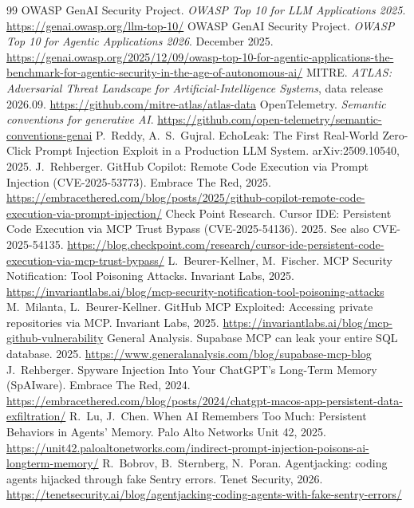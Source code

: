 \begin{thebibliography}{99}\small
{} OWASP GenAI Security Project. \emph{OWASP Top 10 for LLM Applications 2025}. \url{https://genai.owasp.org/llm-top-10/}
 OWASP GenAI Security Project. \emph{OWASP Top 10 for Agentic Applications 2026}. December 2025. \url{https://genai.owasp.org/2025/12/09/owasp-top-10-for-agentic-applications-the-benchmark-for-agentic-security-in-the-age-of-autonomous-ai/}
 MITRE. \emph{ATLAS: Adversarial Threat Landscape for Artificial-Intelligence Systems}, data release 2026.09. \url{https://github.com/mitre-atlas/atlas-data}
 OpenTelemetry. \emph{Semantic conventions for generative AI}. \url{https://github.com/open-telemetry/semantic-conventions-genai}
 P.~Reddy, A.~S.~Gujral. EchoLeak: The First Real-World Zero-Click Prompt Injection Exploit in a Production LLM System. arXiv:2509.10540, 2025.
 J.~Rehberger. GitHub Copilot: Remote Code Execution via Prompt Injection (CVE-2025-53773). Embrace The Red, 2025. \url{https://embracethered.com/blog/posts/2025/github-copilot-remote-code-execution-via-prompt-injection/}
 Check Point Research. Cursor IDE: Persistent Code Execution via MCP Trust Bypass (CVE-2025-54136). 2025. See also CVE-2025-54135. \url{https://blog.checkpoint.com/research/cursor-ide-persistent-code-execution-via-mcp-trust-bypass/}
 L.~Beurer-Kellner, M.~Fischer. MCP Security Notification: Tool Poisoning Attacks. Invariant Labs, 2025. \url{https://invariantlabs.ai/blog/mcp-security-notification-tool-poisoning-attacks}
 M.~Milanta, L.~Beurer-Kellner. GitHub MCP Exploited: Accessing private repositories via MCP. Invariant Labs, 2025. \url{https://invariantlabs.ai/blog/mcp-github-vulnerability}
 General Analysis. Supabase MCP can leak your entire SQL database. 2025. \url{https://www.generalanalysis.com/blog/supabase-mcp-blog}
 J.~Rehberger. Spyware Injection Into Your ChatGPT's Long-Term Memory (SpAIware). Embrace The Red, 2024. \url{https://embracethered.com/blog/posts/2024/chatgpt-macos-app-persistent-data-exfiltration/}
 R.~Lu, J.~Chen. When AI Remembers Too Much: Persistent Behaviors in Agents' Memory. Palo Alto Networks Unit 42, 2025. \url{https://unit42.paloaltonetworks.com/indirect-prompt-injection-poisons-ai-longterm-memory/}
 R.~Bobrov, B.~Sternberg, N.~Poran. Agentjacking: coding agents hijacked through fake Sentry errors. Tenet Security, 2026. \url{https://tenetsecurity.ai/blog/agentjacking-coding-agents-with-fake-sentry-errors/}

\end{thebibliography}
